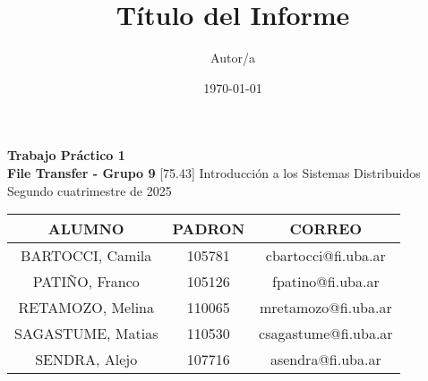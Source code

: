 \documentclass[12pt]{article}
\title{Título del Informe}
\author{Autor/a}
\date{\today}
\begin{document}
    \begin{titlepage} %
    \centering
    \vfill
    \Huge \textbf{Trabajo Práctico 1 \\ File Transfer - Grupo 9}
    \vskip2cm
    \Large [75.43] Introducción a los Sistemas Distribuidos\\
    Segundo cuatrimestre de 2025
    \vfill
    \vfill
    \begin{tabular}{ | c | c | c | }
      \hline
      ALUMNO & PADRON & CORREO \\ \hline
      BARTOCCI, Camila & 105781 & cbartocci@fi.uba.ar \\ \hline
      PATIÑO, Franco & 105126 & fpatino@fi.uba.ar \\ \hline
      RETAMOZO, Melina & 110065 & mretamozo@fi.uba.ar \\ \hline
      SAGASTUME, Matias & 110530 & csagastume@fi.uba.ar \\ \hline
      SENDRA, Alejo & 107716 & asendra@fi.uba.ar \\ \hline

  	\end{tabular}
    \vfill
    \vfill
\end{titlepage}
\newpage



\tableofcontents
\newpage








\end{document}
